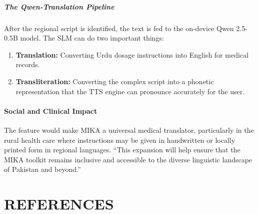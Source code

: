 \documentclass[12pt,a4paper]{report}
\begin{document}
\paragraph{The Qwen-Translation Pipeline}
After the regional script is identified, the text is fed to the on-device Qwen 2.5-0.5B model. The SLM can do two important things: 

\begin{enumerate}
    \item \textbf{Translation:} Converting Urdu dosage instructions  into English for medical records.
    \item \textbf{Transliteration:} Converting the complex script into a phonetic representation that the TTS engine can pronounce accurately for the user.
\end{enumerate}
 
\subsubsection{Social and Clinical Impact}
The feature would make MIKA a universal medical translator, particularly in the rural health care where instructions may be given in handwritten or locally printed form in regional languages. “This expansion will help ensure that the MIKA toolkit remains inclusive and accessible to the diverse linguistic landscape of Pakistan and beyond.”
 
\clearpage


\chapter*{REFERENCES}
\label{ch:references}
\end{document}
